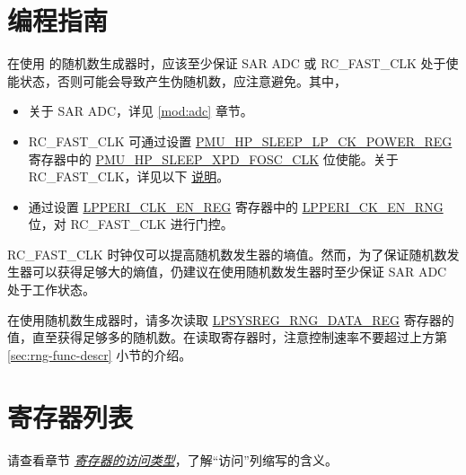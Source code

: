 \documentclass[main\_\_CN.tex]{subfiles}
\begin{document}
\section{编程指南}

在使用 \chipname{} 的随机数生成器时，应该至少保证 SAR ADC 或 RC\_FAST\_CLK 处于使能状态，否则可能会导致产生伪随机数，应注意避免。其中，
\begin{itemize}
    \item 关于 SAR ADC，详见 \ref{mod:adc} \textit{} 章节。
    \item RC\_FAST\_CLK 可通过设置 \hyperref[regdesc:PMUHPSLEEPLPCKPOWERREG]{PMU\_HP\_SLEEP\_LP\_CK\_POWER\_REG} 寄存器中的 \hyperref[fielddesc:PMUHPSLEEPXPDFOSCCLK]{PMU\_HP\_SLEEP\_XPD\_FOSC\_CLK} 位使能。关于 RC\_FAST\_CLK，详见以下 \hyperref[others:rng-note-clock-seed]{说明}。
    \item 通过设置 \hyperref[regdesc:LPPERICLKENREG]{LPPERI\_CLK\_EN\_REG} 寄存器中的 \hyperref[fielddesc:LPPERICKENRNG]{LPPERI\_CK\_EN\_RNG} 位，对 RC\_FAST\_CLK 进行门控。
\end{itemize}
\begin{tiplisting}
    \label{others:rng-note-clock-seed}
    RC\_FAST\_CLK 时钟仅可以提高随机数发生器的墒值。然而，为了保证随机数发生器可以获得足够大的熵值，仍建议在使用随机数发生器时至少保证 SAR ADC 处于工作状态。
\end{tiplisting}

在使用随机数生成器时，请多次读取 \hyperref[regdesc:LPSYSREGRNGDATAREG]{LPSYSREG\_RNG\_DATA\_REG} 寄存器的值，直至获得足够多的随机数。在读取寄存器时，注意控制速率不要超过上方第 \ref{sec:rng-func-descr} 小节的介绍。





\newpage

\hypertarget{rng-reg-summ}{}
\section{寄存器列表}
\label{sec:rng-reg-summ}


请查看章节 \hyperref[glossary-access-types]{\textit{寄存器的访问类型}}，了解“访问”列缩写的含义。
\end{document}
